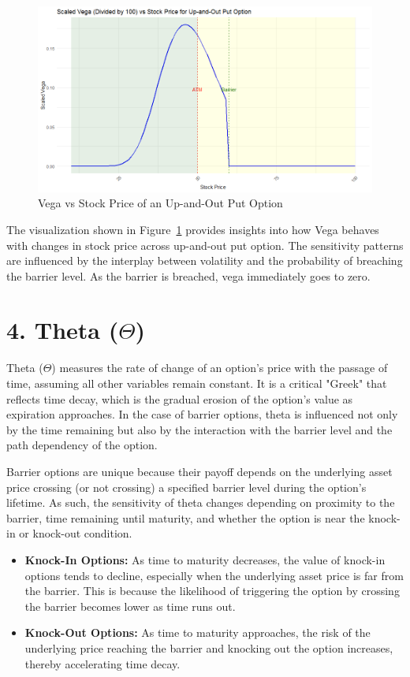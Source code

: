 \begin{figure}[H]
    \centering
    \includegraphics[width=.65\linewidth]{content/images/vega.png}
    \caption{Vega vs Stock Price of an Up-and-Out Put Option}
    \label{fig:vega_behavior}
\end{figure}

The visualization shown in Figure~\ref{fig:vega_behavior} provides insights into how Vega behaves with changes in stock price across up-and-out put option. The sensitivity patterns are influenced by the interplay between volatility and the probability of breaching the barrier level. As the barrier is breached, vega immediately goes to zero.

\section{4. Theta (\(\Theta\))}

Theta (\(\Theta\)) measures the rate of change of an option's price with the passage of time, assuming all other variables remain constant. It is a critical "Greek" that reflects time decay, which is the gradual erosion of the option's value as expiration approaches. In the case of barrier options, theta is influenced not only by the time remaining but also by the interaction with the barrier level and the path dependency of the option.

Barrier options are unique because their payoff depends on the underlying asset price crossing (or not crossing) a specified barrier level during the option's lifetime. As such, the sensitivity of theta changes depending on proximity to the barrier, time remaining until maturity, and whether the option is near the knock-in or knock-out condition.

\begin{itemize}
    \item \textbf{Knock-In Options:} As time to maturity decreases, the value of knock-in options tends to decline, especially when the underlying asset price is far from the barrier. This is because the likelihood of triggering the option by crossing the barrier becomes lower as time runs out.
    
    \item \textbf{Knock-Out Options:} As time to maturity approaches, the risk of the underlying price reaching the barrier and knocking out the option increases, thereby accelerating time decay.
\end{itemize}


